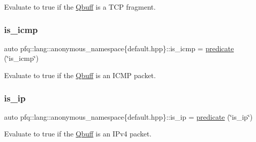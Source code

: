 Evaluate to {\ttfamily true} if the \hyperlink{structpfq_1_1lang_1_1Qbuff}{Qbuff} is a T\+CP fragment. 

\mbox{\label{namespacepfq_1_1lang_1_1anonymous__namespace_02default_8hpp_03_a01ccba89c8582ba423393226b54f12de}} 
\subsubsection{\texorpdfstring{is\+\_\+icmp}{is\_icmp}}
{\footnotesize\ttfamily auto pfq\+::lang\+::anonymous\+\_\+namespace\{default.\+hpp\}\+::is\+\_\+icmp = \hyperlink{namespacepfq_1_1lang_aca9adafc436b7f851621b979fa1aaf88}{predicate} (\char`\"{}is\+\_\+icmp\char`\"{})}



Evaluate to {\ttfamily true} if the \hyperlink{structpfq_1_1lang_1_1Qbuff}{Qbuff} is an I\+C\+MP packet. 

\mbox{\label{namespacepfq_1_1lang_1_1anonymous__namespace_02default_8hpp_03_aa97a34e12e4c6bc2d85a5c169800cfa4}} 
\subsubsection{\texorpdfstring{is\+\_\+ip}{is\_ip}}
{\footnotesize\ttfamily auto pfq\+::lang\+::anonymous\+\_\+namespace\{default.\+hpp\}\+::is\+\_\+ip = \hyperlink{namespacepfq_1_1lang_aca9adafc436b7f851621b979fa1aaf88}{predicate} (\char`\"{}is\+\_\+ip\char`\"{})}



Evaluate to {\ttfamily true} if the \hyperlink{structpfq_1_1lang_1_1Qbuff}{Qbuff} is an I\+Pv4 packet. 

